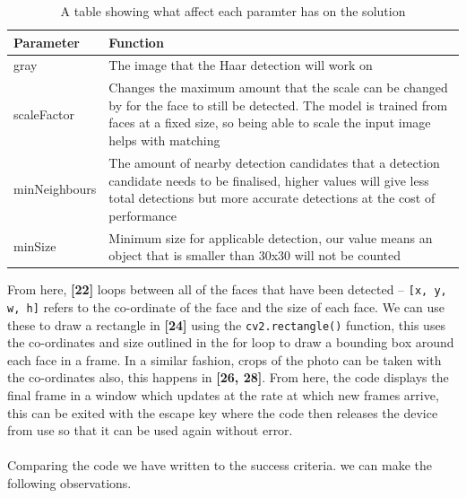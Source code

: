 \documentclass[9pt]{article}
\begin{document}
\begin{table}[H]
	\centering
	\begin{tabularx}{\textwidth}{lX}
		\textbf{Parameter} & \textbf{Function}                                                                                                                                                                                          \\ \midrule
		gray               & The image that the Haar detection will work on                                                                                                                                                             \\
		scaleFactor        & Changes the maximum amount that the scale can be changed by for the face to still be detected. The model is trained from faces at a fixed size, so being able to scale the input image helps with matching \\
		minNeighbours      & The amount of nearby detection candidates that a detection candidate needs to be finalised, higher values will give less total detections but more accurate detections at the cost of performance          \\
		minSize            & Minimum size for applicable detection, our value means an object that is smaller than 30x30 will not be counted                                                                                           \\ \bottomrule
	\end{tabularx}
	\caption{A table showing what affect each paramter has on the solution}
	\label{tab_haarParamsExplain}
\end{table}
From here, \textbf{[22]} loops between all of the faces that have been detected -- \texttt{[x, y, w, h]} refers to the co-ordinate of the face and the size of each face. We can use these to draw a rectangle in \textbf{[24]} using the \texttt{cv2.rectangle()} function, this uses the co-ordinates and size outlined in the for loop to draw a bounding box around each face in a frame. In a similar fashion, crops of the photo can be taken with the co-ordinates also, this happens in \textbf{[26, 28]}. From here, the code displays the final frame in a window which updates at the rate at which new frames arrive, this can be exited with the escape key where the code then releases the device from use so that it can be used again without error.\\\\
Comparing the code we have written to the success criteria. we can make the following observations.
\end{document}
